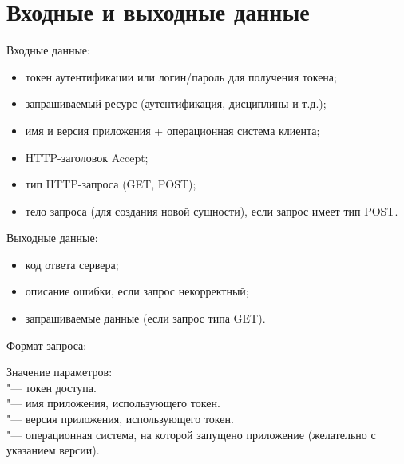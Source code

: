 \chapter{Входные и выходные данные}
\label{ch:io}

Входные данные:
\begin{itemize}
  \item токен аутентификации или логин/пароль для получения токена;
  \item запрашиваемый ресурс (аутентификация, дисциплины и т.д.);
  \item имя и версия приложения + операционная система клиента;
  \item HTTP-заголовок Accept;
  \item тип HTTP-запроса (GET, POST);
  \item тело запроса (для создания новой сущности), если запрос имеет тип POST\@.\\
\end{itemize}

Выходные данные:
\begin{itemize}
  \item код ответа сервера;
  \item описание ошибки, если запрос некорректный;
  \item запрашиваемые данные (если запрос типа GET).\\
\end{itemize}

Формат запроса:
\begin{listing}[H]
\end{listing}
\vspace{-0.75cm}

Значение параметров:\\
 "--- токен доступа.\\
 "--- имя приложения, использующего токен.\\
 "--- версия приложения, использующего токен.\\
 "--- операционная система, на которой запущено приложение (желательно с указанием версии).
